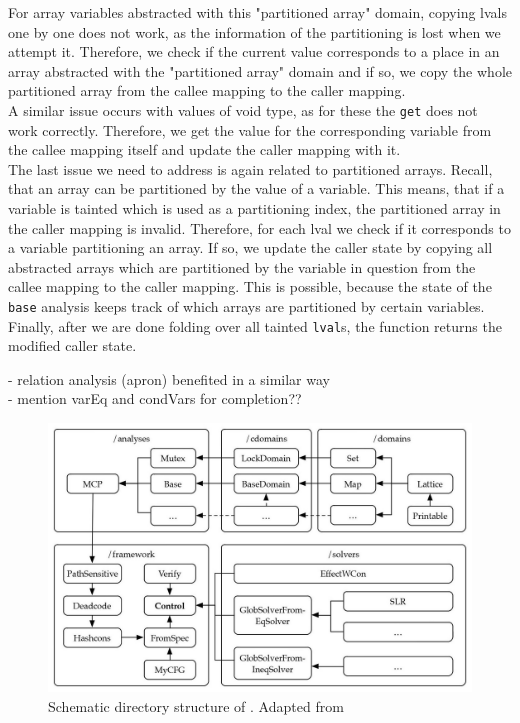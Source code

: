     For array variables abstracted with this "partitioned array" domain, copying \ac{lval}s one by one does not work, as the information of the partitioning is lost when we attempt it. Therefore, we check if the current value corresponds to a place in an array abstracted with the "partitioned array" domain and if so, we copy the whole partitioned array from the callee mapping to the caller mapping.\\
    A similar issue occurs with values of void type, as for these the \texttt{get} does not work correctly. Therefore, we get the value for the corresponding variable from the callee mapping itself and update the caller mapping with it.\\
    The last issue we need to address is again related to partitioned arrays. Recall, that an array can be partitioned by the value of a variable. This means, that if a variable is tainted which is used as a partitioning index, the partitioned array in the caller mapping is invalid. Therefore, for each \ac{lval} we check if it corresponds to a variable partitioning an array. If so, we update the caller state by copying all abstracted arrays which are partitioned by the variable in question from the callee mapping to the caller mapping. This is possible, because the state of the \texttt{base} analysis keeps track of which arrays are partitioned by certain variables.\\
    Finally, after we are done folding over all tainted \texttt{lval}s, the function returns the modified caller state.

    - relation analysis (apron) benefited in a similar way\\
    - mention varEq and condVars for completion??\\

  
    \begin{figure}
      \centering
      \includegraphics{../figures/goblint_structure_detailed.jpg}
      \caption{Schematic directory structure of \gob. Adapted from \parencite{apinis2014frameworks}}
      \label{fig:gob_structure_detail}
    \end{figure}

